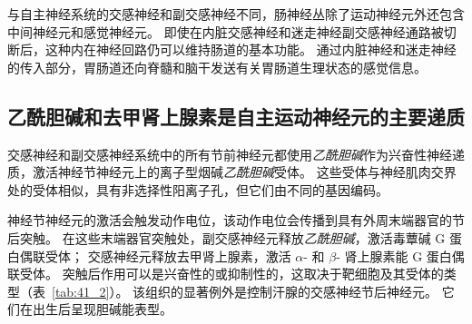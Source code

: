 与自主神经系统的交感神经和副交感神经不同，肠神经丛除了运动神经元外还包含中间神经元和感觉神经元。
即使在内脏交感神经和迷走神经副交感神经通路被切断后，这种内在神经回路仍可以维持肠道的基本功能。
通过内脏神经和迷走神经的传入部分，胃肠道还向脊髓和脑干发送有关胃肠道生理状态的感觉信息。



\subsection{乙酰胆碱和去甲肾上腺素是自主运动神经元的主要递质}

交感神经和副交感神经系统中的所有节前神经元都使用\textit{乙酰胆碱}作为兴奋性神经递质，激活神经节神经元上的离子型烟碱\textit{乙酰胆碱}受体。
这些受体与神经肌肉交界处的受体相似，具有非选择性阳离子孔，但它们由不同的基因编码。


神经节神经元的激活会触发动作电位，该动作电位会传播到具有外周末端器官的节后突触。
在这些末端器官突触处，副交感神经元释放\textit{乙酰胆碱}，激活毒蕈碱 G 蛋白偶联受体；
交感神经元释放去甲肾上腺素，激活 $\alpha$- 和 $\beta$- 肾上腺素能 G 蛋白偶联受体。
突触后作用可以是兴奋性的或抑制性的，这取决于靶细胞及其受体的类型（表~\ref{tab:41_2}）。
该组织的显著例外是控制汗腺的交感神经节后神经元。
它们在出生后呈现胆碱能表型。


